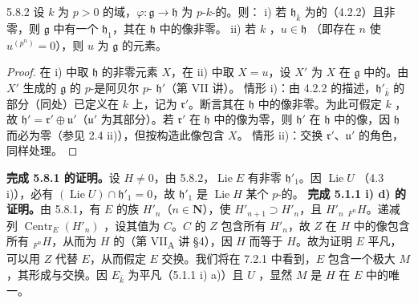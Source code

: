 \begin{SGAresult}{}{5.8.2}
设 $k$ 为 $p>0$ 的域，$\varphi:\mathfrak g\to\mathfrak h$ 为 $p$-$k$-的。则：
i) 若 $\mathfrak h_{\bar k}$ 为的（4.2.2）且非零，则 $\mathfrak g$ 中有一个  $\mathfrak h_1$，其在 $\mathfrak h$ 中的像非零。
ii) 若 $k$ ，$u\in\mathfrak h$ （即存在 $n$ 使 $u^{(p^n)}=0$），则 $u$ 为 $\mathfrak g$ 的元素。
\end{SGAresult}
\begin{proof}
在 i) 中取 $\mathfrak h$ 的非零元素 $X$，在 ii) 中取 $X=u$，设 $X'$ 为 $X$ 在 $\mathfrak g$ 中的。由 $X'$ 生成的 $\mathfrak g$ 的 $p$-是阿贝尔 $p$- $\mathfrak h'$（第 VII 讲）。
情形 i)：由 4.2.2 的描述，$\mathfrak h'_{\bar k}$ 的部分（同处）已定义在 $k$ 上，记为 $\mathfrak r'$。断言其在 $\mathfrak h$ 中的像非零。为此可假定 $k$ ，故 $\mathfrak h'=\mathfrak r'\oplus\mathfrak u'$（$\mathfrak u'$ 为其部分）。若 $\mathfrak r'$ 在 $\mathfrak h$ 中的像为零，则 $\mathfrak h'$ 在 $\mathfrak h$ 中的像，因 $\mathfrak h$ 而必为零（参见 2.4 ii)），但按构造此像包含 $X$。
情形 ii)：交换 $\mathfrak r'$、$\mathfrak u'$ 的角色，同样处理。
\end{proof}
\textbf{完成 5.8.1 的证明。}设 $H\ne0$，由 5.8.2，$\operatorname{Lie}E$ 有非零  $\mathfrak h'_1$。因 $\operatorname{Lie}U$ （4.3 i)），必有 $(\operatorname{Lie}U)\cap\mathfrak h'_1=0$，故 $\mathfrak h'_1$ 是 $\operatorname{Lie}H$ 某个 $p$-的。
\textbf{完成 5.1.1 i) d) 的证明。}由 5.8.1，有 $E$ 的族 $H'_n$（$n\in\mathbf N$），使 $H'_{n+1}\supset H'_n$，且 $H'_n$  ${}_{F^n}H$。递减列 $\operatorname{Centr}_E(H'_n)$ ，设其值为 $C$。$C$ 的 $Z$ 包含所有 $H'_n$，故 $Z$ 在 $H$ 中的像包含所有 ${}_{F^n}H$，从而为 $H$ 的（第 VII\textsubscript{A} 讲 §4），因 $H$ 而等于 $H$。故为证明 $E$ 平凡，可以用 $Z$ 代替 $E$，从而假定 $E$ 交换。我们将在 7.2.1 中看到，$E$ 包含一个极大 $M$，其形成与交换。因 $E_{\bar k}$ 为平凡（5.1.1 i) a)）且 $U$ ，显然 $M$ 是 $H$ 在 $E$ 中的唯一。
